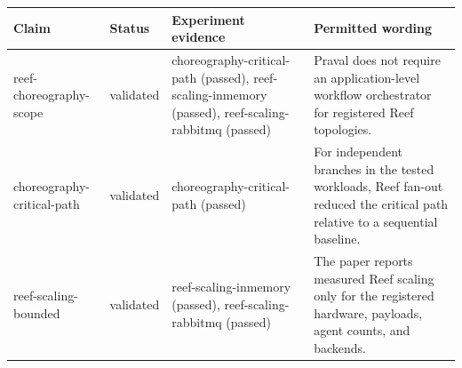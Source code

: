 \begin{tabular}{llll}
\hline
Claim & Status & Experiment evidence & Permitted wording \\
\hline
reef-choreography-scope & validated & choreography-critical-path (passed), reef-scaling-inmemory (passed), reef-scaling-rabbitmq (passed) & Praval does not require an application-level workflow orchestrator for registered Reef topologies. \\
choreography-critical-path & validated & choreography-critical-path (passed) & For independent branches in the tested workloads, Reef fan-out reduced the critical path relative to a sequential baseline. \\
reef-scaling-bounded & validated & reef-scaling-inmemory (passed), reef-scaling-rabbitmq (passed) & The paper reports measured Reef scaling only for the registered hardware, payloads, agent counts, and backends. \\
\hline
\end{tabular}

